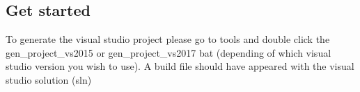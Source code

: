 \subsection*{Get started}

To generate the visual studio project please go to tools and double click the gen\+\_\+project\+\_\+vs2015 or gen\+\_\+project\+\_\+vs2017 bat (depending of which visual studio version you wish to use). A build file should have appeared with the visual studio solution (sln) 